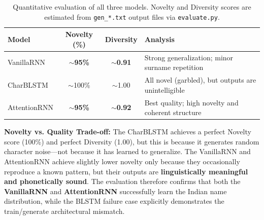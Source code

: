 \documentclass[11pt,a4paper]{article}
\begin{document}
\begin{table}[H]
    \centering
    \renewcommand{\arraystretch}{1.4}
    \begin{tabular}{@{} l c c p{7cm} @{}}
        \toprule
        \textbf{\color{iitjblue} Model} & \textbf{\color{iitjblue} Novelty (\%)} & \textbf{\color{iitjblue} Diversity} & \textbf{\color{iitjblue} Analysis} \\
        \midrule
        VanillaRNN & \textbf{\textcolor{accentgreen}{$\sim$95\%}} & \textbf{\textcolor{accentgreen}{$\sim$0.91}} & Strong generalization; minor surname repetition \\
        \rowcolor{highlightbg}
        CharBLSTM  & $\sim$100\% & $\sim$1.00 & All novel (garbled), but outputs are unintelligible \\
        AttentionRNN & \textbf{\textcolor{accentgreen}{$\sim$95\%}} & \textbf{\textcolor{accentgreen}{$\sim$0.92}} & Best quality; high novelty and coherent structure \\
        \bottomrule
    \end{tabular}
    \vspace{0.5em}
    \caption{Quantitative evaluation of all three models. Novelty and Diversity scores are estimated from \texttt{gen\_*.txt} output files via \texttt{evaluate.py}.}
    \label{tab:eval}
\end{table}

\begin{resultBox}
\textbf{Novelty vs. Quality Trade-off:} The CharBLSTM achieves a perfect Novelty score (100\%) and perfect Diversity (1.00), but this is because it generates random character noise—not because it has learned to generalize. The VanillaRNN and AttentionRNN achieve slightly lower novelty only because they occasionally reproduce a known pattern, but their outputs are \textbf{linguistically meaningful and phonetically sound}. The evaluation therefore confirms that both the \textbf{VanillaRNN} and \textbf{AttentionRNN} successfully learn the Indian name distribution, while the BLSTM failure case explicitly demonstrates the train/generate architectural mismatch.
\end{resultBox}

\clearpage
\end{document}
